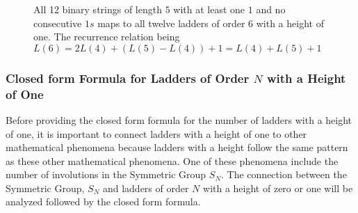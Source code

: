 \begin{center}
\begin{figure}[!htp]
\begin{minipage}{.4\textwidth}
    \end{minipage}

    \caption{All 12 binary strings of length $5$ with at least one $1$ and no consecutive $1s$ maps to all twelve ladders of order $6$ with a height of one. 
    The recurrence relation being $L(6)=2L(4)+(L(5)-L(4))+1=L(4)+L(5)+1$}
    \label{Fig:MapBinToLadder}
\end{figure}
\end{center}



\subsubsection{Closed form Formula for Ladders of Order $N$ with a Height of One}
Before providing the closed form formula for the number of ladders with a height of one, it is important to connect ladders with a height of one to other 
mathematical phenomena because ladders with a height follow the same pattern as these other mathematical phenomena. \cite{A12} One of these phenomena include 
the number of involutions in the Symmetric Group $S_{N}$.\cite{A13} The connection between the Symmetric Group, $S_{N}$ and ladders of order $N$ with a height 
of zero or one will be analyzed followed by the closed form formula.\par 

